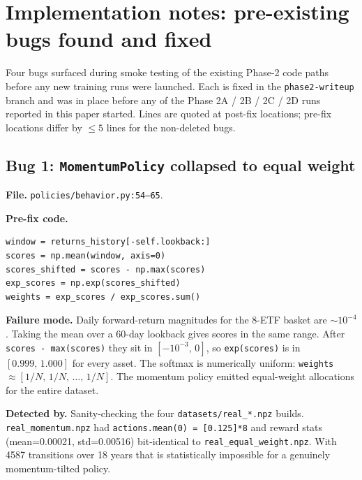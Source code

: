 
\section{Implementation notes: pre-existing bugs found and fixed}
\label{app:implementation}

Four bugs surfaced during smoke testing of the existing Phase-2 code
paths before any new training runs were launched. Each is fixed in the
\texttt{phase2-writeup} branch and was in place before any of the
Phase 2A / 2B / 2C / 2D runs reported in this paper started. Lines are
quoted at post-fix locations; pre-fix locations differ by $\le 5$ lines
for the non-deleted bugs.

\subsection{Bug 1: \texttt{MomentumPolicy} collapsed to equal weight}
\label{app:impl:momentum}

\textbf{File.} \texttt{policies/behavior.py:54--65}.

\textbf{Pre-fix code.}
\begin{verbatim}
window = returns_history[-self.lookback:]
scores = np.mean(window, axis=0)
scores_shifted = scores - np.max(scores)
exp_scores = np.exp(scores_shifted)
weights = exp_scores / exp_scores.sum()
\end{verbatim}

\textbf{Failure mode.} Daily forward-return magnitudes for the 8-ETF
basket are $\sim\!10^{-4}$. Taking the mean over a 60-day lookback gives
scores in the same range. After \texttt{scores - max(scores)} they sit
in $[-10^{-3},\,0]$, so \texttt{exp(scores)} is in $[0.999,\,1.000]$ for
every asset. The softmax is numerically uniform: \texttt{weights} $\approx
[1/N,\,1/N,\,\ldots,\,1/N]$. The momentum policy emitted equal-weight
allocations for the entire dataset.

\textbf{Detected by.} Sanity-checking the four
\texttt{datasets/real\_*.npz} builds. \texttt{real\_momentum.npz} had
\texttt{actions.mean(0) = [0.125]*8} and reward stats
(mean=0.00021, std=0.00516) bit-identical to
\texttt{real\_equal\_weight.npz}. With 4587 transitions over 18 years
that is statistically impossible for a genuinely momentum-tilted policy.

